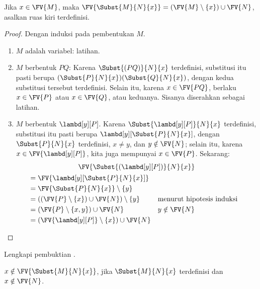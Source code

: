 \documentclass[../../../include/open-logic-section]{subfiles}
\begin{document}
\begin{thm} 
  Jika $x \in \FV{M}$, maka $\FV{\Subst{M}{N}{x}} = (\FV{M} \setminus
  \{x\}) \cup \FV{N}$, asalkan ruas kiri terdefinisi.
\end{thm}

\begin{proof}
  Dengan induksi pada pembentukan $M$.
  \begin{enumerate}
  \item $M$ adalah variabel: latihan.
  \item $M$ berbentuk $PQ$: Karena $\Subst{(PQ)}{N}{x}$ terdefinisi,
    substitusi itu pasti berupa
    $(\Subst{P}{N}{x})(\Subst{Q}{N}{x})$, dengan kedua substitusi tersebut
    terdefinisi. Selain itu, karena $x \in \FV{PQ}$, berlaku $x \in \FV{P}$
    atau $x \in \FV{Q}$, atau keduanya. Sisanya diserahkan sebagai latihan.
  \item $M$ berbentuk $\lambd[y][P]$. Karena
    $\Subst{\lambd[y][P]}{N}{x}$ terdefinisi, substitusi itu pasti berupa
    $\lambd[y][\Subst{P}{N}{x}]$, dengan $\Subst{P}{N}{x}$ terdefinisi,
    $x \neq y$, dan $y \notin \FV{N}$; selain itu, karena $x \in
    \FV{\lambd[y][P]}$, kita juga mempunyai $x \in \FV{P}$. Sekarang:
    \begin{multline*}
      \FV{\Subst{(\lambd[y][P])}{N}{x}} \\
      \begin{aligned}
      & = \FV{\lambd[y][\Subst{P}{N}{x}]} \\
      & = \FV{\Subst{P}{N}{x}} \setminus \{y\} \\
      & = ((\FV{P} \setminus \{x\}) \cup \FV{N}) \setminus \{y\}
       && \text{menurut hipotesis induksi} \\
      & = (\FV{P} \setminus \{x, y\}) \cup \FV{N}
       && y \notin \FV{N} \\
      & = (\FV{\lambd[y][P]} \setminus \{x\}) \cup \FV{N}
      \end{aligned}
      \end{multline*}
  \end{enumerate}
\end{proof}

\begin{prob}
  Lengkapi pembuktian .
\end{prob}

\begin{thm}
  $x \notin \FV{\Subst{M}{N}{x}}$, jika $\Subst{M}{N}{x}$ terdefinisi dan
  $x \notin \FV{N}$.
\end{thm}
\end{document}
